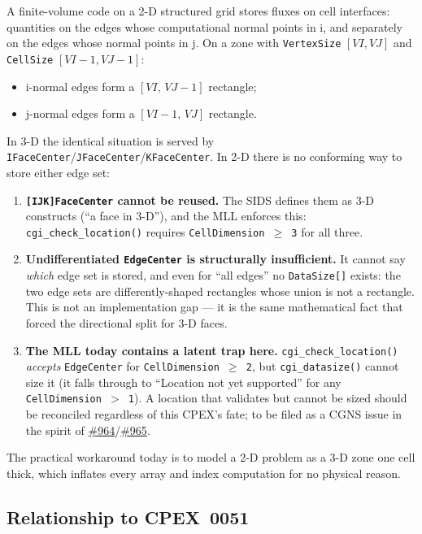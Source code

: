 \documentclass[11pt,letterpaper]{article}
\begin{document}
A finite-volume code on a 2-D structured grid stores fluxes on cell
interfaces: quantities on the edges whose computational normal points in
i, and separately on the edges whose normal points in j. On a zone with
\texttt{VertexSize} $[VI, VJ]$ and \texttt{CellSize} $[VI{-}1, VJ{-}1]$:

\begin{itemize}[leftmargin=2em]
\item i-normal edges form a $[VI, \, VJ{-}1]$ rectangle;
\item j-normal edges form a $[VI{-}1, \, VJ]$ rectangle.
\end{itemize}

In 3-D the identical situation is served by
\texttt{IFaceCenter}/\texttt{JFaceCenter}/\texttt{KFaceCenter}. In 2-D
there is no conforming way to store either edge set:

\begin{enumerate}[leftmargin=2em]
\item \textbf{\texttt{[IJK]FaceCenter} cannot be reused.} The SIDS
  defines them as 3-D constructs (``a face in 3-D''), and the MLL
  enforces this: \texttt{cgi\_check\_location()} requires
  \texttt{CellDimension~$\geq$~3} for all three.
\item \textbf{Undifferentiated \texttt{EdgeCenter} is structurally
  insufficient.} It cannot say \emph{which} edge set is stored, and
  even for ``all edges'' no \texttt{DataSize[]} exists: the two edge
  sets are differently-shaped rectangles whose union is not a
  rectangle. This is not an implementation gap --- it is the same
  mathematical fact that forced the directional split for 3-D faces.
\item \textbf{The MLL today contains a latent trap here.}
  \texttt{cgi\_check\_location()} \emph{accepts} \texttt{EdgeCenter}
  for \texttt{CellDimension~$\geq$~2}, but \texttt{cgi\_datasize()}
  cannot size it (it falls through to ``Location not yet supported''
  for any \texttt{CellDimension~$>$~1}). A location that validates but
  cannot be sized should be reconciled regardless of this CPEX's fate;
  to be filed as a CGNS issue in the spirit of
  \href{https://github.com/CGNS/CGNS/issues/964}{\#964}/\href{https://github.com/CGNS/CGNS/issues/965}{\#965}.
\end{enumerate}

The practical workaround today is to model a 2-D problem as a 3-D zone
one cell thick, which inflates every array and index computation for no
physical reason.

\subsection{Relationship to CPEX~0051}
\end{document}
